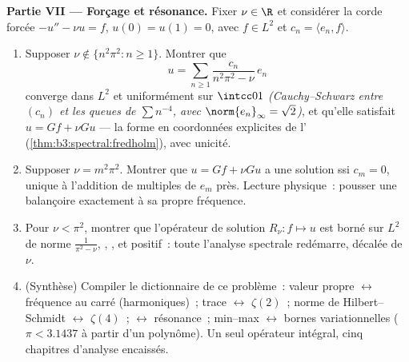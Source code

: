 \begin{problem}
\medskip
\noindent\textbf{Partie VII --- Forçage et résonance.} Fixer
$\nu \in \R$ et considérer la corde forcée $-u'' - \nu u =
f$, $u(0) = u(1) = 0$, avec $f \in L^2$ et $c_n = \langle
e_n, f\rangle$.
\begin{enumerate}[resume]
  \item Supposer $\nu \notin \{n^2\pi^2 : n \geq 1\}$. Montrer
        que
        \[
        u = \sum_{n\geq1}\frac{c_n}{n^2\pi^2 - \nu}\,e_n
        \]
        converge dans $L^2$ et uniformément sur $\intcc01$
        \emph{(Cauchy--Schwarz entre $(c_n)$ et les queues de
        $\sum n^{-4}$, avec $\norm{e_n}_\infty = \sqrt2$)},
        et qu'elle satisfait $u = Gf + \nu Gu$ --- la forme
        en coordonnées explicites de l' (\cref{thm:b3:spectral:fredholm}), avec
        unicité.
  \item Supposer $\nu = m^2\pi^2$. Montrer que $u = Gf + \nu
        Gu$ a une solution ssi $c_m = 0$, unique à
        l'addition de multiples de $e_m$ près. Lecture
        physique~: pousser une balançoire exactement à sa
        propre fréquence.
  \item Pour $\nu < \pi^2$, montrer que l'opérateur de
        solution $R_\nu\colon f \mapsto u$ est borné sur
        $L^2$ de norme $\frac1{\pi^2 - \nu}$, ,
        , et positif~: toute l'analyse spectrale
        redémarre, décalée de $\nu$.
  \item (Synthèse) Compiler le dictionnaire de ce problème~:
        valeur propre $\leftrightarrow$ fréquence au carré
        (harmoniques)~; trace $\leftrightarrow$ $\zeta(2)$~;
        norme de Hilbert--Schmidt $\leftrightarrow$
        $\zeta(4)$~; 
        $\leftrightarrow$ résonance~; min--max
        $\leftrightarrow$ bornes variationnelles ($\pi <
        3.1437$ à partir d'un polynôme). Un seul opérateur
        intégral, cinq chapitres d'analyse encaissés.
\end{enumerate}


\end{problem}
